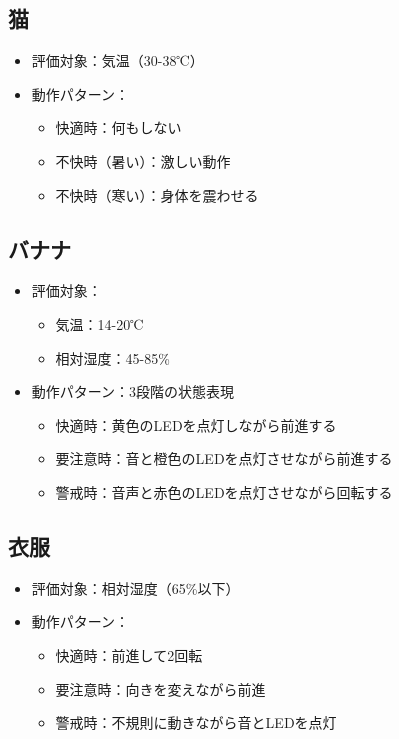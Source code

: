 \documentclass{cuxarticle}
\begin{document}
\subsection{猫}
\begin{itemize}
  \item 評価対象：気温（30-38℃）\cite{stellaEnvironmentalAspectsDomestic2016}
  \item 動作パターン：
    \begin{itemize}
      \item 快適時：何もしない
      \item 不快時（暑い）：激しい動作
      \item 不快時（寒い）：身体を震わせる
    \end{itemize}
\end{itemize}

\subsection{バナナ}
\begin{itemize}
  \item 評価対象：
    \begin{itemize}
      \item 気温：14-20℃
      \item 相対湿度：45-85\%\cite{--バナナの}
    \end{itemize}
  \item 動作パターン：3段階の状態表現
    \begin{itemize}
      \item 快適時：黄色のLEDを点灯しながら前進する
      \item 要注意時：音と橙色のLEDを点灯させながら前進する
      \item 警戒時：音声と赤色のLEDを点灯させながら回転する
    \end{itemize}
\end{itemize}

\subsection{衣服}
\begin{itemize}
  \item 評価対象：相対湿度（65\%以下）\cite{--クローゼ}
  \item 動作パターン：
    \begin{itemize}
      \item 快適時：前進して2回転
      \item 要注意時：向きを変えながら前進
      \item 警戒時：不規則に動きながら音とLEDを点灯
    \end{itemize}
\end{itemize}
\end{document}

